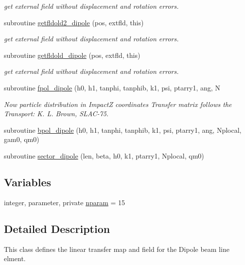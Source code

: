 \begin{DoxyCompactItemize}
\begin{DoxyCompactList}\small\item\em get external field without displacement and rotation errors. \end{DoxyCompactList}\item 
subroutine \mbox{\hyperlink{namespacedipoleclass_abab9a0945263c7c75aa7ef9f94c07b9a}{getfldold2\+\_\+dipole}} (pos, extfld, this)
\begin{DoxyCompactList}\small\item\em get external field without displacement and rotation errors. \end{DoxyCompactList}\item 
subroutine \mbox{\hyperlink{namespacedipoleclass_a417b00dd769e534be3746eaeff56c074}{getfldold\+\_\+dipole}} (pos, extfld, this)
\begin{DoxyCompactList}\small\item\em get external field without displacement and rotation errors. \end{DoxyCompactList}\item 
subroutine \mbox{\hyperlink{namespacedipoleclass_ab0dd1e8b5ca921939ce0d97f0bd817ee}{fpol\+\_\+dipole}} (h0, h1, tanphi, tanphib, k1, psi, ptarry1, ang, N
\begin{DoxyCompactList}\small\item\em Now particle distribution in ImpactZ coordinates Transfer matrix follows the Transport\+: K. L. Brown, S\+L\+A\+C-\/75. \end{DoxyCompactList}\item 
subroutine \mbox{\hyperlink{namespacedipoleclass_aecb437418e23046347e41045d2988d3b}{bpol\+\_\+dipole}} (h0, h1, tanphi, tanphib, k1, psi, ptarry1, ang, Nplocal, gam0, qm0)
\item 
subroutine \mbox{\hyperlink{namespacedipoleclass_a2aaba3f2e21950bbcafe3eb744fff547}{sector\+\_\+dipole}} (len, beta, h0, k1, ptarry1, Nplocal, qm0)
\end{DoxyCompactItemize}
\subsection*{Variables}
\begin{DoxyCompactItemize}
\item 
integer, parameter, private \mbox{\hyperlink{namespacedipoleclass_abc619199e1e9a2811da9e97630125da3}{nparam}} = 15
\end{DoxyCompactItemize}


\subsection{Detailed Description}
This class defines the linear transfer map and field for the Dipole beam line elment. 

